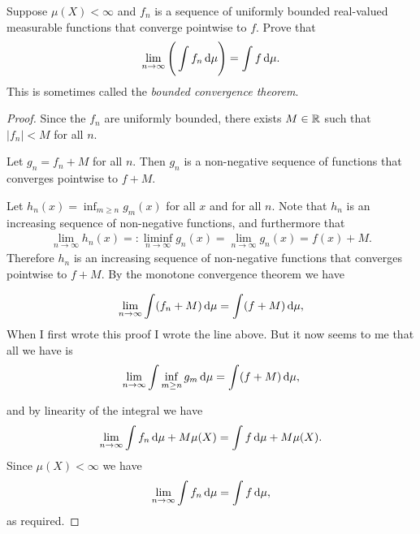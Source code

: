 \newpage
\begin{mdframed}
  Suppose $\mu(X) < \infty$ and $f_n$ is a sequence of uniformly bounded real-valued measurable functions that
  converge pointwise to $f$. Prove that
\begin{align*}
  \lim_{n \to \infty} \Bigg( \int f_n \d\mu \Bigg) = \int f \d\mu.
\end{align*}
  This is sometimes called the {\it bounded convergence theorem}.
\end{mdframed}


\begin{proof}
  Since the $f_n$ are uniformly bounded, there exists $M \in \mathbb{R}$ such that $|f_n| < M$ for all $n$.

  Let $g_n = f_n + M$ for all $n$. Then $g_n$ is a non-negative sequence of functions that converges
  pointwise to $f + M$.

  Let $h_n(x) = \inf_{m \geq n} g_m(x)$ for all $x$ and for all $n$. Note that $h_n$ is an increasing sequence
  of non-negative functions, and furthermore that
  \begin{align*}
    \lim_{n \to \infty} h_n(x) =: \liminf_{n \to \infty} g_n(x) = \lim_{n \to \infty} g_n(x) = f(x) + M.
  \end{align*}
  Therefore $h_n$ is an increasing sequence of non-negative functions that converges pointwise to $f + M$. By
  the monotone convergence theorem we have
  \begin{mdframed}
    \begin{align*}
    \lim_{n\to\infty} \int (f_n + M) \d\mu = \int (f + M) \d\mu,
    \end{align*}
   When I first wrote this proof I wrote the line above. But it now seems to me that all we have is
  \begin{align*}
    \lim_{n\to\infty} \int \inf_{m \geq n} g_m \d\mu = \int (f + M) \d\mu,
  \end{align*}
  \end{mdframed}
  and by linearity of the integral we have
  \begin{align*}
    \lim_{n\to\infty} \int f_n \d\mu + M \mu(X) = \int f \d\mu + M \mu(X).
  \end{align*}
  Since $\mu(X) < \infty$ we have
  \begin{align*}
    \lim_{n\to\infty} \int f_n \d\mu = \int f \d\mu,
  \end{align*}
  as required.
\end{proof}
